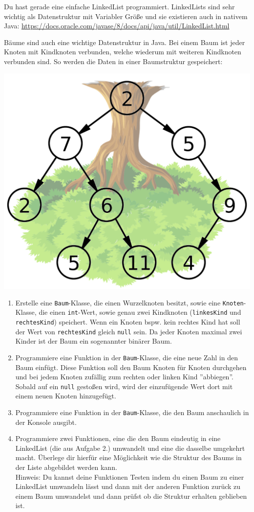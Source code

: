 \documentclass{../../sheet}
\begin{document}
Du hast gerade eine einfache LinkedList programmiert. LinkedLists sind sehr wichtig als Datenstruktur mit Variabler Größe und sie existieren auch in nativem Java: \url{https://docs.oracle.com/javase/8/docs/api/java/util/LinkedList.html}

\newpage
{}
Bäume sind auch eine wichtige Datenstruktur in Java. Bei einem Baum ist jeder Knoten mit Kindknoten verbunden, welche wiederum mit weiteren Kindknoten verbunden sind. So werden die Daten in einer Baumstruktur gespeichert:
\\
\begin{center}
    \includegraphics[width=0.5\linewidth]{img/baum.png}
\end{center}

\begin{enumerate}
    \item Erstelle eine \texttt{Baum}-Klasse, die einen Wurzelknoten besitzt, sowie eine \texttt{Knoten}-Klasse, die einen \texttt{int}-Wert, sowie genau zwei Kindknoten (\texttt{linkesKind} und \texttt{rechtesKind}) speichert. Wenn ein Knoten bspw. kein rechtes Kind hat soll der Wert von \texttt{rechtesKind} gleich \texttt{null} sein. Da jeder Knoten maximal zwei Kinder ist der Baum ein sogenannter binärer Baum.
    \item Programmiere eine Funktion in der \texttt{Baum}-Klasse, die eine neue Zahl in den Baum einfügt. Diese Funktion soll den Baum Knoten für Knoten durchgehen und bei jedem Knoten zufällig zum rechten oder linken Kind ''abbiegen''. Sobald auf ein \texttt{null} gestoßen wird, wird der einzufügende Wert dort mit einem neuen Knoten hinzugefügt.
    \item Programmiere eine Funktion in der \texttt{Baum}-Klasse, die den Baum anschaulich in der Konsole ausgibt.
    \item Programmiere zwei Funktionen, eine die den Baum eindeutig in eine LinkedList (die aus Aufgabe 2.) umwandelt und eine die dasselbe umgekehrt macht. Überlege dir hierfür eine Möglichkeit wie die Struktur des Baums in der Liste abgebildet werden kann.\\
    Hinweis: Du kannst deine Funktionen Testen indem du einen Baum zu einer LinkedList umwandeln lässt und dann mit der anderen Funktion zurück zu einem Baum umwandelst und dann prüfst ob die Struktur erhalten geblieben ist.
\end{enumerate}
\end{document}
